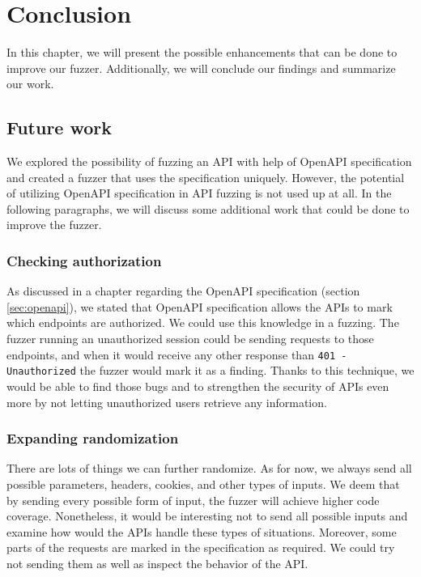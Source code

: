 \chapter{Conclusion}
In this chapter, we will present the possible enhancements that can be done to improve our fuzzer. Additionally, we will conclude our findings and summarize our work.

\section{Future work}
We explored the possibility of fuzzing an API with help of OpenAPI specification and created a fuzzer that uses the specification uniquely. However, the potential of utilizing OpenAPI specification in API fuzzing is not used up at all. In the following paragraphs, we will discuss some additional work that could be done to improve the fuzzer.

\subsection{Checking authorization}
As discussed in a chapter regarding the OpenAPI specification (section \ref{sec:openapi}), we stated that OpenAPI specification allows the APIs to mark which endpoints are authorized. We could use this knowledge in a fuzzing. The fuzzer running an unauthorized session could be sending requests to those endpoints, and when it would receive any other response than \texttt{401 - Unauthorized} the fuzzer would mark it as a finding. Thanks to this technique, we would be able to find those bugs and to strengthen the security of APIs even more by not letting unauthorized users retrieve any information.

\subsection{Expanding randomization}
There are lots of things we can further randomize. As for now, we always send all possible parameters, headers, cookies, and other types of inputs. We deem that by sending every possible form of input, the fuzzer will achieve higher code coverage. Nonetheless, it would be interesting not to send all possible inputs and examine how would the APIs handle these types of situations. Moreover, some parts of the requests are marked in the specification as required. We could try not sending them as well as inspect the behavior of the API.

